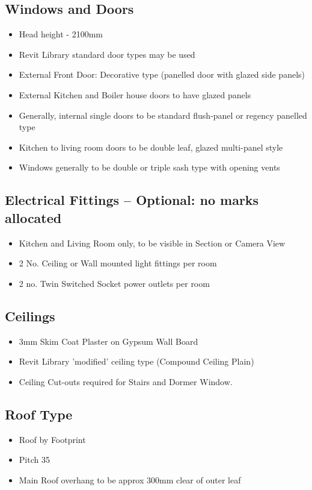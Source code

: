 \subsection*{Windows and Doors}
\begin{itemize}
	\item Head height - 2100mm
	\item Revit Library standard door types may be used
	\item External Front Door: Decorative type (panelled door with glazed side panels)
	\item External Kitchen and Boiler house doors to have glazed panels
	\item Generally, internal single doors to be standard flush-panel or regency panelled type
	\item Kitchen to living room doors to be double leaf, glazed multi-panel style
	\item Windows generally to be double or triple sash type with opening vents
\end{itemize}


\subsection*{Electrical Fittings -- Optional: no marks allocated}
\begin{itemize}
	\item Kitchen and Living Room only, to be visible in Section or Camera View
	\item 2 No. Ceiling or Wall mounted light fittings per room
	\item 2 no. Twin Switched Socket power outlets per room
\end{itemize}


\subsection*{Ceilings}
\begin{itemize}
	\item 3mm Skim Coat Plaster on Gypsum Wall Board
	\item Revit Library 'modified' ceiling type (Compound Ceiling Plain)
	\item Ceiling Cut-outs required for Stairs and Dormer Window.
\end{itemize}



\subsection*{Roof Type}
\begin{itemize}
	\item Roof by Footprint
	\item Pitch 35\degree
	\item Main Roof overhang to be approx 300mm clear of outer leaf	
\end{itemize}



